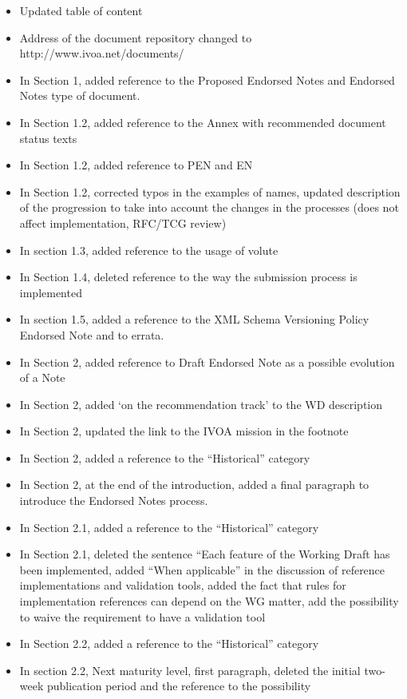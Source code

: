 \documentclass[11pt,a4paper]{ivoa}
\begin{document}
\begin{itemize}
\item  Updated table of content
\item  Address of the document repository changed to
http://www.ivoa.net/documents/
\item In Section 1, added reference to the Proposed Endorsed Notes and
Endorsed Notes type of document.
\item In Section 1.2, added reference to the Annex with recommended document
status texts
\item In Section 1.2, added reference to PEN and EN
\item In Section 1.2, corrected typos in the examples of names, updated
description of the progression to take into account the changes in the
processes (does not affect implementation, RFC/TCG review)
\item In section 1.3, added reference to the usage of volute
\item In Section 1.4, deleted reference to the way the submission process is
implemented
\item In section 1.5, added a reference to the XML Schema Versioning Policy
Endorsed
Note and to errata.
\item In Section 2, added reference to Draft Endorsed Note as a possible
evolution of a Note
\item In Section 2, added ‘on the recommendation track’ to the WD description
\item In Section 2, updated the link to the IVOA mission in the footnote
\item In Section 2, added a reference to the “Historical” category
\item In Section 2, at the end of the introduction, added a final paragraph to
introduce the Endorsed Notes process.
\item In Section 2.1, added a reference to the “Historical” category
\item In Section 2.1, deleted the sentence “Each feature of the Working Draft
has been implemented, added “When applicable” in the discussion of
reference implementations and validation tools, added the fact that
rules for implementation references can depend on the WG matter, add the
possibility to waive the requirement to have a validation tool
\item In Section 2.2, added a reference to the “Historical” category
\item In section 2.2, Next maturity level, first paragraph, deleted the
initial two-week publication period and the reference to the possibility

\end{itemize}
\end{document}
